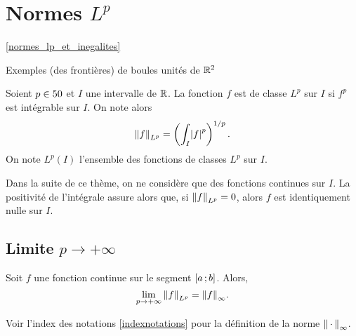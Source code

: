 \section{Normes $L^p$}
\ref{normes_lp_et_inegalites}

\begin{marginfigure}
    \centering
    
    \caption{Exemples (des frontières) de boules unités de $\mathbb{R}^2$}
\end{marginfigure}
\begin{defi}
Soient $p \in 50$ et $I$ une intervalle de $\mathbb{R}$. La fonction $f$ est de classe $L^p$ sur $I$ si $f^p$ est intégrable sur $I$. On note alors
\[
\norm{f}_{L^p} = \left(\int_I \mathopen{}\left| f \right|^p\right)^{1/p}.
\]
On note $L^p(I)$ l'ensemble des fonctions de classes $L^p$ sur $I$.
\end{defi}

\begin{remarque}
Dans la suite de ce thème, on ne considère que des fonctions continues sur $I$. La positivité de l'intégrale assure alors que, si $\norm{f}_{L^p} = 0$, alors $f$ est identiquement nulle sur $I$.
\end{remarque}

\subsection{Limite $p \to +\infty$}

\begin{theo}
Soit $f$ une fonction continue sur le segment $\left[a\,;b\right]$. Alors,
\[
\lim_{p\to+\infty} \norm{f}_{L^p} = \norm{f}_\infty.
\]
\end{theo}
Voir l'index des notations \ref{indexnotations} pour la définition de la norme $\norm{\,\cdot\,}_\infty$.



